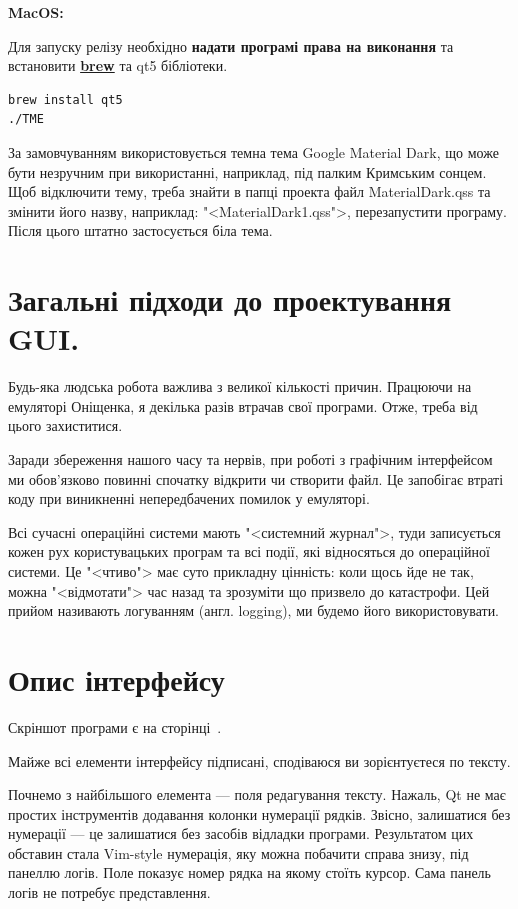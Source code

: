 \documentclass[oneside,final,14pt]{extreport}
\begin{document}
\textbf{MacOS:}

Для запуску релізу необхідно \textbf{надати програмі права на виконання} та встановити \textbf{\href{https://brew.sh}{brew}} та qt5 бібліотеки.
\begin{tcolorbox}	
\begin{verbatim}
brew install qt5
./TME
\end{verbatim}
\end{tcolorbox}
		
За замовчуванням використовується темна тема Google Material Dark, що може бути незручним при використанні, наприклад, під палким Кримським сонцем. Щоб відключити тему, треба знайти в папці проекта файл MaterialDark.qss та змінити його назву, наприклад: "<MaterialDark1.qss">, перезапустити програму. Після цього штатно застосується біла тема.

\section{Загальні підходи до проектування GUI.}
Будь-яка людська робота важлива з великої кількості причин. Працюючи на емуляторі Оніщенка, я декілька разів втрачав свої програми. Отже, треба від цього захиститися.
		
Заради збереження нашого часу та нервів, при роботі з графічним інтерфейсом ми обов'язково повинні спочатку відкрити чи створити файл. Це запобігає втраті коду при виникненні непередбачених помилок у емуляторі.

Всі сучасні операційні системи мають "<системний журнал">, туди записується кожен рух користувацьких програм та всі події, які відносяться до операційної системи. Це "<чтиво"> має суто прикладну цінність: коли щось йде не так, можна "<відмотати"> час назад та зрозуміти що призвело до катастрофи. Цей прийом називають логуванням (англ. logging), ми будемо його використовувати.
\section{Опис інтерфейсу}
Скріншот програми є на сторінці \,\pageref{screenshot}.
\medskip

Майже всі елементи інтерфейсу підписані, сподіваюся ви зорієнтуєтеся по тексту.

Почнемо з найбільшого елемента --- поля редагування тексту. Нажаль, Qt не має простих інструментів додавання колонки нумерації рядків. Звісно, залишатися без нумерації --- це залишатися без засобів відладки програми. Результатом цих обставин стала Vim-style нумерація, яку можна побачити справа знизу, під панеллю логів. Поле показує номер рядка на якому стоїть курсор. Сама панель логів не потребує представлення.
\end{document}
